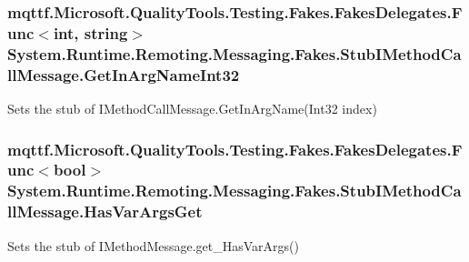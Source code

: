 \hypertarget{class_system_1_1_runtime_1_1_remoting_1_1_messaging_1_1_fakes_1_1_stub_i_method_call_message_aa507dbef73dbf5cabab883056706f55f}{
\subsubsection[{Get\-In\-Arg\-Name\-Int32}]{\setlength{\rightskip}{0pt plus 5cm}mqttf.\-Microsoft.\-Quality\-Tools.\-Testing.\-Fakes.\-Fakes\-Delegates.\-Func$<$int, string$>$ System.\-Runtime.\-Remoting.\-Messaging.\-Fakes.\-Stub\-I\-Method\-Call\-Message.\-Get\-In\-Arg\-Name\-Int32}}\label{class_system_1_1_runtime_1_1_remoting_1_1_messaging_1_1_fakes_1_1_stub_i_method_call_message_aa507dbef73dbf5cabab883056706f55f}


Sets the stub of I\-Method\-Call\-Message.\-Get\-In\-Arg\-Name(\-Int32 index)

\hypertarget{class_system_1_1_runtime_1_1_remoting_1_1_messaging_1_1_fakes_1_1_stub_i_method_call_message_ac7db8390e971140e55e2f3119801ba80}{
\subsubsection[{Has\-Var\-Args\-Get}]{\setlength{\rightskip}{0pt plus 5cm}mqttf.\-Microsoft.\-Quality\-Tools.\-Testing.\-Fakes.\-Fakes\-Delegates.\-Func$<$bool$>$ System.\-Runtime.\-Remoting.\-Messaging.\-Fakes.\-Stub\-I\-Method\-Call\-Message.\-Has\-Var\-Args\-Get}}\label{class_system_1_1_runtime_1_1_remoting_1_1_messaging_1_1_fakes_1_1_stub_i_method_call_message_ac7db8390e971140e55e2f3119801ba80}


Sets the stub of I\-Method\-Message.\-get\-\_\-\-Has\-Var\-Args()

